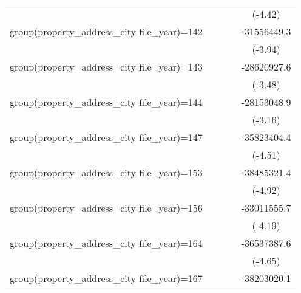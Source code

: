 {\begin{tabular}{l*{4}{c}}
                    &                     &                     &                     &     (-4.42)         \\
\addlinespace
group(property\_address\_city file\_year)=142&                     &                     &                     & -31556449.3\sym{***}\\
                    &                     &                     &                     &     (-3.94)         \\
\addlinespace
group(property\_address\_city file\_year)=143&                     &                     &                     & -28620927.6\sym{***}\\
                    &                     &                     &                     &     (-3.48)         \\
\addlinespace
group(property\_address\_city file\_year)=144&                     &                     &                     & -28153048.9\sym{**} \\
                    &                     &                     &                     &     (-3.16)         \\
\addlinespace
group(property\_address\_city file\_year)=147&                     &                     &                     & -35823404.4\sym{***}\\
                    &                     &                     &                     &     (-4.51)         \\
\addlinespace
group(property\_address\_city file\_year)=153&                     &                     &                     & -38485321.4\sym{***}\\
                    &                     &                     &                     &     (-4.92)         \\
\addlinespace
group(property\_address\_city file\_year)=156&                     &                     &                     & -33011555.7\sym{***}\\
                    &                     &                     &                     &     (-4.19)         \\
\addlinespace
group(property\_address\_city file\_year)=164&                     &                     &                     & -36537387.6\sym{***}\\
                    &                     &                     &                     &     (-4.65)         \\
\addlinespace
group(property\_address\_city file\_year)=167&                     &                     &                     & -38203020.1\sym{***}\\

\end{tabular}}
